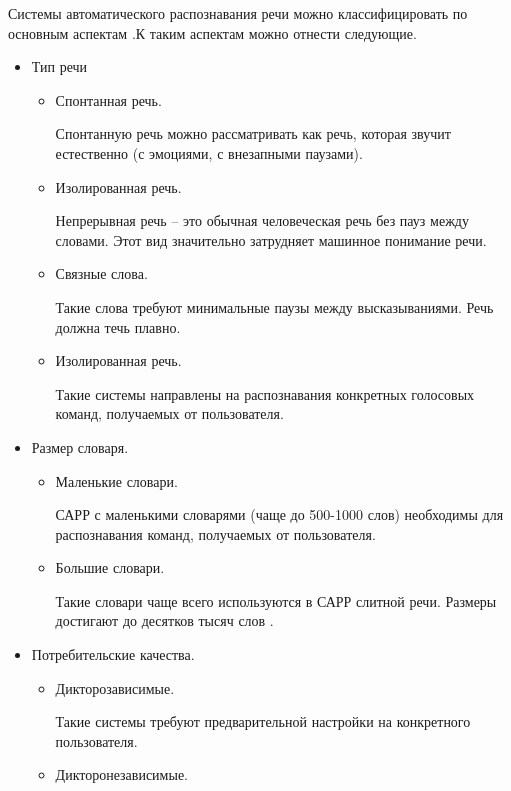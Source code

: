 Системы автоматического распознавания речи можно классифицировать по основным аспектам \cite{classif}.К таким аспектам можно отнести следующие. 
\begin{itemize}
	\item Тип речи
	\begin{itemize}
		\item Спонтанная речь.
		
		Спонтанную речь можно рассматривать как речь, которая звучит естественно (с эмоциями, с внезапными паузами).
		
		\item Изолированная речь. 
		
		Непрерывная речь -- это обычная человеческая речь без пауз между словами. Этот вид значительно затрудняет машинное понимание речи.
		
		\item Связные слова.
		
		Такие слова требуют минимальные паузы между высказываниями. Речь должна течь плавно.
		
		\item Изолированная речь.
		
		Такие системы направлены на распознавания конкретных голосовых команд, получаемых от пользователя.
		
	\end{itemize}
	
	\item Размер словаря.
	\begin{itemize}
		\item Маленькие словари.
		
		САРР с маленькими словарями (чаще до 500-1000 слов) необходимы для распознавания команд, получаемых от пользователя.
		
		\item Большие словари.
		
		Такие словари чаще всего используются в САРР слитной речи. Размеры достигают до десятков тысяч слов \cite{babin}.
	\end{itemize}
	
	\item Потребительские качества.
	\begin{itemize}
		\item Дикторозависимые.
		
		Такие системы требуют предварительной настройки на конкретного пользователя.
		
		\item Дикторонезависимые.
		

\end{itemize}
\end{itemize}
